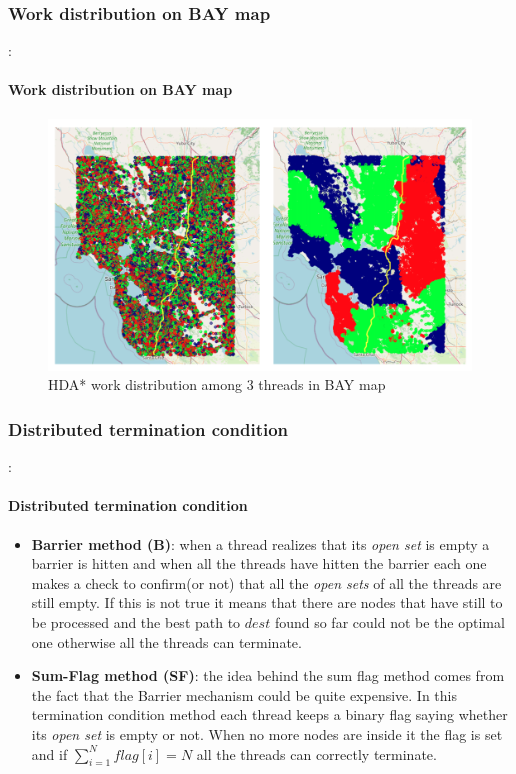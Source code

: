 \documentclass[12pt]{beamer}
\begin{document}
	\subsubsection{Work distribution on BAY map}
	\begin{frame}{\secname : \subsecname}
		\framesubtitle{Work distribution on BAY map}
		\begin{figure}[ht!]
			\centering
			\small
			\includegraphics[width=0.8\linewidth]{hda/hda_work_BAY.png}
			\caption{HDA* work distribution among 3 threads in BAY map}
			\label{hdawork1}
		  \end{figure}
	\end{frame}
	\subsubsection{Distributed termination condition}
	\begin{frame}{\secname : \subsecname}
		\framesubtitle{Distributed termination condition}
		\begin{itemize}
			\item \textbf{Barrier method (B)}: when a thread realizes that its \textit{open set} is
			empty a barrier is 
			hitten and when all the threads have hitten the barrier
			each one makes a check to confirm(or not) that all the \textit{open sets} of all
			the threads are still empty. If this is not true it means that there are nodes
			that have still to be processed and the best path to $dest$ found so far could
			not be the optimal one otherwise all the threads can terminate.
			\item \textbf{Sum-Flag method (SF)}: the idea behind the sum flag method comes from the fact that
			the Barrier mechanism could be quite expensive. In this termination condition method
			each thread keeps a binary flag saying whether its \textit{open set} is empty
			or not. When no more nodes are inside it the flag is set and if $\sum_{i=1}^{N}flag[i] = N$
			all the threads can correctly terminate.
		\end{itemize}
	\end{frame}
\end{document}

